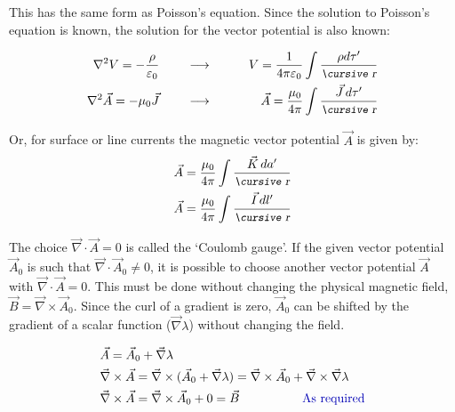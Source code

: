 \documentclass[12pt]{article}
\begin{document}
\begin{flushleft}
This has the same form as Poisson's equation.  Since the solution to Poisson's equation is known, the solution for the vector potential is also known:

\begin{eqnarray*}
\nabla^{2} V = -\frac{\rho}{\varepsilon_{0}} \hspace{.3in} & \longrightarrow  & \hspace{.3in} V=\frac{1}{4\pi \varepsilon_{0}} \int \frac{\rho d\tau^{\prime}}{\text{\small\slshape\cursive r}} \\
\nabla^{2} \vec{A} = -\mu_{0}\vec{J} \hspace{.3in} &  \longrightarrow  & \hspace{.3in} \vec{A} = \frac{\mu_{0}}{4\pi} \int \frac{\vec{J} \, d\tau^{\prime}}{\text{\small\slshape\cursive r}} 
\end{eqnarray*}

Or, for surface or line currents the magnetic vector potential $\vec{A}$ is given by:
\begin{eqnarray*}
\begin{aligned}
& \vec{A} = \frac{\mu_{0}}{4\pi} \int \frac{\vec{K} \, da^{\prime}}{\text{\small\slshape\cursive r}} \\
& \vec{A} = \frac{\mu_{0}}{4\pi} \int \frac{\vec{I} \, dl^{\prime}}{\text{\small\slshape\cursive r}}
\end{aligned}
\end{eqnarray*}

The choice $\vec{\nabla} \cdot \vec{A}=0$ is called the `Coulomb gauge'.  If  the given vector potential $
\vec{A}_{0}$ is such that $\vec{\nabla} \cdot \vec{A}_{0} \ne 0$, it is possible to choose another vector potential $\vec{A}$ with $\vec{\nabla} \cdot \vec{A} =0$.  This must be done without changing the physical magnetic field, $\vec{B}=\vec{\nabla} \times \vec{A}_{0}$.  Since the curl of a gradient is zero, $\vec{A}_{0}$ can be shifted by the gradient of a scalar function ($\vec{\nabla} \lambda$) without changing the field.

\begin{eqnarray*}
\begin{aligned}
& \vec{A} = \vec{A}_{0} + \vec{\nabla} \lambda \\
& \vec{\nabla} \times \vec{A} = \vec{\nabla} \times (\vec{A}_{0} +\vec{\nabla}\lambda) = \vec{\nabla} \times \vec{A}_{0} + \vec{\nabla} \times \vec{\nabla}\lambda \\
&\vec{\nabla} \times \vec{A} = \vec{\nabla} \times \vec{A}_{0} + 0 = \vec{B}  \hspace{.7in} \text{\color{myblue} As required}
\end{aligned}
\end{eqnarray*}


\end{flushleft}
\end{document}
